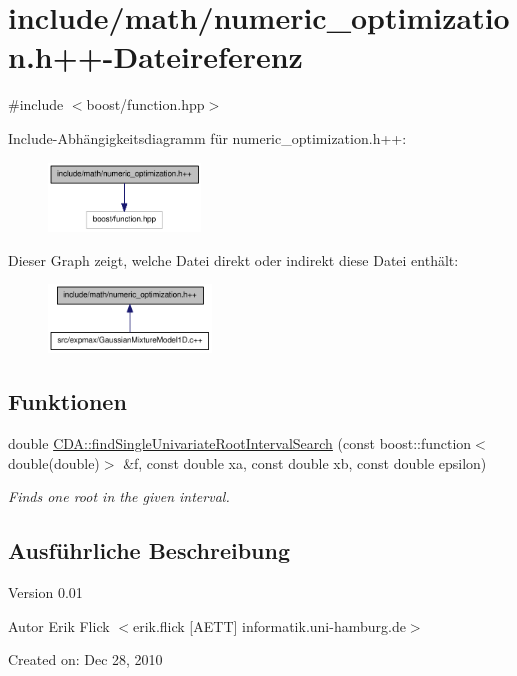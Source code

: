 \hypertarget{numeric__optimization_8h_09_09}{
\section{include/math/numeric\_\-optimization.h++-\/Dateireferenz}
\label{numeric__optimization_8h_09_09}
}
{\ttfamily \#include $<$boost/function.hpp$>$}\par
Include-\/Abhängigkeitsdiagramm für numeric\_\-optimization.h++:\nopagebreak
\begin{figure}[H]
\begin{center}
\leavevmode
\includegraphics[width=115pt]{numeric__optimization_8h_09_09__incl}
\end{center}
\end{figure}
Dieser Graph zeigt, welche Datei direkt oder indirekt diese Datei enthält:\nopagebreak
\begin{figure}[H]
\begin{center}
\leavevmode
\includegraphics[width=123pt]{numeric__optimization_8h_09_09__dep__incl}
\end{center}
\end{figure}
\subsection*{Funktionen}
\begin{DoxyCompactItemize}
\item 
double \hyperlink{namespaceCDA_ab4d6ad3bb6730a396ee12d33fe5ad7ca}{CDA::findSingleUnivariateRootIntervalSearch} (const boost::function$<$ double(double)$>$ \&f, const double xa, const double xb, const double epsilon)
\begin{DoxyCompactList}\small\item\em Finds one root in the given interval. \item\end{DoxyCompactList}\end{DoxyCompactItemize}


\subsection{Ausführliche Beschreibung}
\begin{DoxyVersion}{Version}
0.01 
\end{DoxyVersion}
\begin{DoxyAuthor}{Autor}
Erik Flick $<$erik.flick \mbox{[}AETT\mbox{]} informatik.uni-\/hamburg.de$>$
\end{DoxyAuthor}
Created on: Dec 28, 2010 